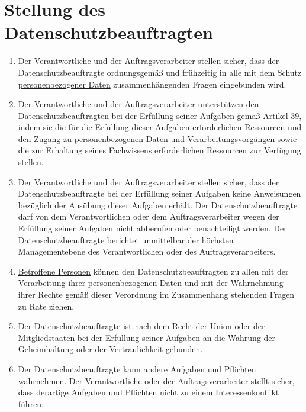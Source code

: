 \chapter{Stellung des Datenschutzbeauftragten}
\label{ch:38}


\begin{enumerate}

  \item Der Verantwortliche und der Auftragsverarbeiter stellen sicher, dass der Datenschutzbeauftragte ordnungsgemäß
   und frühzeitig in alle mit dem Schutz \hyperref[itm:04-1]{personenbezogener Daten} zusammenhängenden Fragen eingebunden wird.
  \label{itm:38-1}

  \item Der Verantwortliche und der Auftragsverarbeiter unterstützen den Datenschutzbeauftragten bei der Erfüllung
   seiner Aufgaben gemäß \hyperref[ch:39]{Artikel 39}, indem sie die für die Erfüllung dieser Aufgaben erforderlichen
   Ressourcen und den Zugang zu \hyperref[itm:04-1]{personenbezogenen Daten} und Verarbeitungsvorgängen sowie die zur Erhaltung seines
   Fachwissens erforderlichen Ressourcen zur Verfügung stellen.
  \label{itm:38-2}

  \item Der Verantwortliche und der Auftragsverarbeiter stellen sicher, dass der Datenschutzbeauftragte bei der
   Erfüllung seiner Aufgaben keine Anweisungen bezüglich der Ausübung dieser Aufgaben erhält. Der
   Datenschutzbeauftragte darf von dem Verantwortlichen oder dem Auftragsverarbeiter wegen der Erfüllung seiner
   Aufgaben nicht abberufen oder benachteiligt werden. Der Datenschutzbeauftragte berichtet unmittelbar der höchsten
   Managementebene des Verantwortlichen oder des Auftragsverarbeiters.
  \label{itm:38-3}

  \item \hyperref[itm:04-1]{Betroffene Personen} können den Datenschutzbeauftragten zu allen mit der \hyperref[itm:04-2]{Verarbeitung} ihrer personenbezogenen
   Daten und mit der Wahrnehmung ihrer Rechte gemäß dieser Verordnung im Zusammenhang stehenden Fragen zu Rate ziehen.
  \label{itm:38-4}

  \item Der Datenschutzbeauftragte ist nach dem Recht der Union oder der Mitgliedstaaten bei der Erfüllung seiner
   Aufgaben an die Wahrung der Geheimhaltung oder der Vertraulichkeit gebunden.
  \label{itm:38-5}

  \item Der Datenschutzbeauftragte kann andere Aufgaben und Pflichten wahrnehmen. Der Verantwortliche oder der
   Auftragsverarbeiter stellt sicher, dass derartige Aufgaben und Pflichten nicht zu einem Interessenkonflikt führen.
  \label{itm:38-6}

\end{enumerate}


